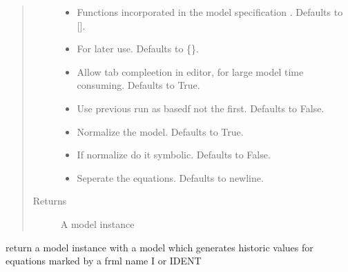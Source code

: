 \documentclass[letterpaper,10pt,english]{sphinxmanual}
\begin{document}
\begin{fulllineitems}
\begin{fulllineitems}
\begin{quote}
\begin{description}
\begin{itemize}
\item {} 
\sphinxAtStartPar
{} \textendash{} Functions incorporated in the model specification . Defaults to {[}{]}.

\item {} 
\sphinxAtStartPar
{} \textendash{} For later use. Defaults to \{\}.

\item {} 
\sphinxAtStartPar
{} \textendash{} Allow tab compleetion in editor, for large model time consuming. Defaults to True.

\item {} 
\sphinxAtStartPar
{} \textendash{} Use previous run as basedf not the first. Defaults to False.

\item {} 
\sphinxAtStartPar
{} \textendash{} Normalize the model. Defaults to True.

\item {} 
\sphinxAtStartPar
{} \textendash{} If normalize do it symbolic. Defaults to False.

\item {} 
\sphinxAtStartPar
{} \textendash{} Seperate the equations. Defaults to newline.

\end{itemize}

\item[{Returns}] \leavevmode
\sphinxAtStartPar
A model instance

\end{description}\end{quote}

\end{fulllineitems}


\begin{fulllineitems}
\label{\detokenize{index:modelclass.BaseModel.get_histmodel}}
\pysigstartsignatures
{}
\pysigstopsignatures
\sphinxAtStartPar
return a model instance with a model which generates historic values for equations
marked by a frml name I or IDENT


\end{fulllineitems}
\end{fulllineitems}
\end{document}
